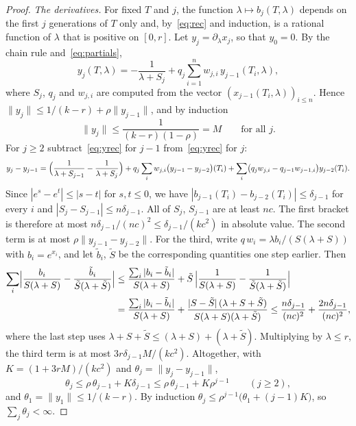 \documentclass[11pt]{amsart}
\theoremstyle{definition}
\begin{document}
\begin{proof}
\emph{The derivatives.} For fixed $T$ and $j$, the function $\lambda\mapsto b_j(T,\lambda)$ depends on the first
$j$ generations of $T$ only and, by~\eqref{eq:rec} and induction, is a rational function of $\lambda$ that is
positive on $[0,r]$. Let $y_j=\partial_\lambda x_j$, so that $y_0=0$. By the chain rule and~\eqref{eq:partials},
\begin{equation}\label{eq:yrec}
   y_j(T,\lambda)=-\frac1{\lambda+S_j}+q_j\sum_{i=1}^nw_{j,i}\,y_{j-1}(T_i,\lambda),
\end{equation}
where $S_j$, $q_j$ and $w_{j,i}$ are computed from the vector $(x_{j-1}(T_i,\lambda))_{i\le n}$. Hence
$\|y_j\|\le1/(k-r)+\rho\|y_{j-1}\|$, and by induction
\[
   \|y_j\|\le\frac1{(k-r)(1-\rho)}=M\qquad\text{for all }j.
\]
For $j\ge2$ subtract~\eqref{eq:yrec} for $j-1$ from~\eqref{eq:yrec} for $j$:
\[
   y_j-y_{j-1}=\Bigl(\frac1{\lambda+S_{j-1}}-\frac1{\lambda+S_j}\Bigr)
     +q_j\sum_iw_{j,i}\bigl(y_{j-1}-y_{j-2}\bigr)(T_i)
     +\sum_i\bigl(q_jw_{j,i}-q_{j-1}w_{j-1,i}\bigr)y_{j-2}(T_i).
\]
Since $|e^s-e^t|\le|s-t|$ for $s,t\le0$, we have $|b_{j-1}(T_i)-b_{j-2}(T_i)|\le\delta_{j-1}$ for every $i$ and
$|S_j-S_{j-1}|\le n\delta_{j-1}$. All of $S_j$, $S_{j-1}$ are at least $nc$. The first bracket is therefore at
most $n\delta_{j-1}/(nc)^2\le\delta_{j-1}/(kc^2)$ in absolute value. The second term is at most
$\rho\|y_{j-1}-y_{j-2}\|$. For the third, write $q\,w_i=\lambda b_i/(S(\lambda+S))$ with $b_i=e^{x_i}$, and let
$\tilde b_i$, $\tilde S$ be the corresponding quantities one step earlier. Then
\begin{align*}
  \sum_i\Bigl|\frac{b_i}{S(\lambda+S)}-\frac{\tilde b_i}{\tilde S(\lambda+\tilde S)}\Bigr|
  &\le\frac{\sum_i|b_i-\tilde b_i|}{S(\lambda+S)}+\tilde S\,\Bigl|\frac1{S(\lambda+S)}-\frac1{\tilde S(\lambda+\tilde S)}\Bigr|\\
  &=\frac{\sum_i|b_i-\tilde b_i|}{S(\lambda+S)}+\frac{|S-\tilde S|\,(\lambda+S+\tilde S)}{S(\lambda+S)(\lambda+\tilde S)}
  \le\frac{n\delta_{j-1}}{(nc)^2}+\frac{2n\delta_{j-1}}{(nc)^2},
\end{align*}
where the last step uses $\lambda+S+\tilde S\le(\lambda+S)+(\lambda+\tilde S)$. Multiplying by $\lambda\le r$, the third
term is at most $3r\delta_{j-1}M/(kc^2)$. Altogether, with $K=(1+3rM)/(kc^2)$ and
$\theta_j=\|y_j-y_{j-1}\|$,
\[
   \theta_j\le\rho\,\theta_{j-1}+K\delta_{j-1}\le\rho\,\theta_{j-1}+K\rho^{j-1}\qquad(j\ge2),
\]
and $\theta_1=\|y_1\|\le1/(k-r)$. By induction $\theta_j\le\rho^{j-1}\bigl(\theta_1+(j-1)K\bigr)$, so
$\sum_j\theta_j<\infty$.


\end{proof}
\end{document}
